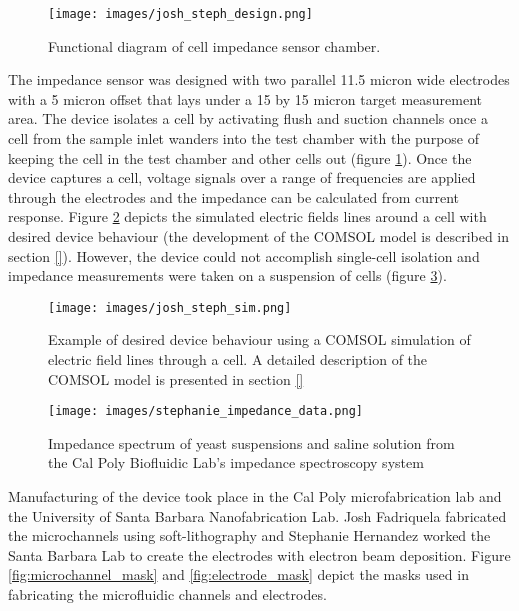 \begin{figure}[h]
    \centering
    \texttt{[image: images/josh\_steph\_design.png]}
    \caption{Functional diagram of cell impedance sensor chamber.}
    \label{fig:josh-steph_functional_diagram}
\end{figure}

\par The impedance sensor was designed with two parallel 11.5 micron wide electrodes with a 5 micron offset that lays under a 15 by 15 micron target measurement area. The device isolates a cell by activating flush and suction channels once a cell from the sample inlet wanders into the test chamber with the purpose of keeping the cell in the test chamber and other cells out (figure \ref{fig:josh-steph_functional_diagram}). Once the device captures a cell, voltage signals over a range of frequencies are applied through the electrodes and the impedance can be calculated from current response.  Figure \ref{fig:josh-steph_sim} depicts the simulated electric fields lines around a cell with desired device behaviour (the development of the COMSOL model is described in section \ref{}). However, the device could not accomplish single-cell isolation and impedance measurements were taken on a suspension of cells (figure \ref{fig:stephanie_impedance_data}).

\begin{figure}[h]
    \centering
    \texttt{[image: images/josh\_steph\_sim.png]}
    \caption[Example of desired device behaviour using a COMSOL simulation of electric field lines through a cell.]{Example of desired device behaviour using a COMSOL simulation of electric field lines through a cell. A detailed description of the COMSOL model is presented in section \ref{}}
    \label{fig:josh-steph_sim}
\end{figure}


\begin{figure}[h]
    \centering
    \texttt{[image: images/stephanie\_impedance\_data.png]}
    \caption[Impedance spectrum of yeast suspensions and saline solution from the Cal Poly Biofluidic Lab's impedance spectroscopy system]{Impedance spectrum of yeast suspensions and saline solution from the Cal Poly Biofluidic Lab's impedance spectroscopy system \cite{hernandez_single_2009-1}}
    \label{fig:stephanie_impedance_data}
\end{figure}

\par Manufacturing of the device took place in the Cal Poly microfabrication lab and the University of Santa Barbara Nanofabrication Lab. Josh Fadriquela fabricated the microchannels using soft-lithography and Stephanie Hernandez worked the Santa Barbara Lab to create the electrodes with electron beam deposition. Figure \ref{fig:microchannel_mask} and \ref{fig:electrode_mask} depict the masks used in fabricating the microfluidic channels and electrodes.

